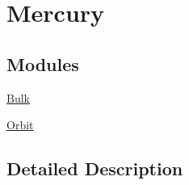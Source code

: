\hypertarget{group___e_g_x_phys-_constants-_astrophysics-_solar_system-_mercury}{}\section{Mercury}
\label{group___e_g_x_phys-_constants-_astrophysics-_solar_system-_mercury}
\subsection*{Modules}
\begin{DoxyCompactItemize}
\item 
\mbox{\hyperlink{group___e_g_x_phys-_constants-_astrophysics-_solar_system-_mercury-_bulk}{Bulk}}
\item 
\mbox{\hyperlink{group___e_g_x_phys-_constants-_astrophysics-_solar_system-_mercury-_orbit}{Orbit}}
\end{DoxyCompactItemize}


\subsection{Detailed Description}
